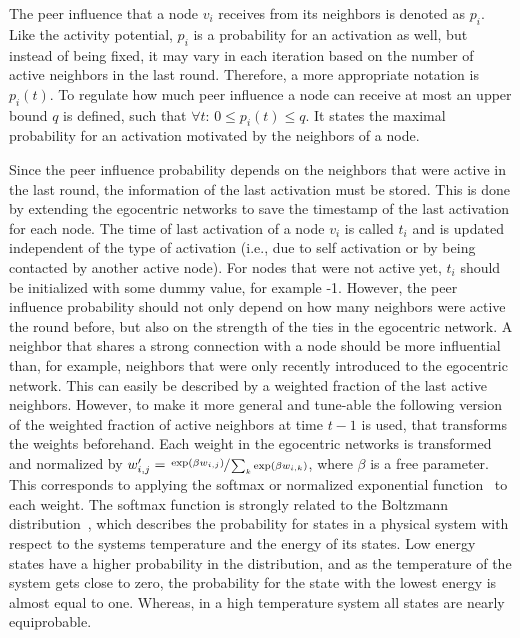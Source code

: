 The peer influence that a node \(v_{i} \) receives from its neighbors is denoted as \( p_{i} \).
Like the activity potential, \( p_{i} \) is a probability for an activation as well, but instead of being fixed, it may vary in each iteration based on the number of active neighbors in the last round.
Therefore, a more appropriate notation is \( p_{i}(t) \).
To regulate how much peer influence a node can receive at most an upper bound \( q \) is defined, such that \(\forall t: \, 0 \leq p_{i}(t) \leq q\).
It states the maximal probability for an activation motivated by the neighbors of a node.

Since the peer influence probability depends on the neighbors that were active in the last round, the information of the last activation must be stored.
This is done by extending the egocentric networks to save the timestamp of the last activation for each node.
The time of last activation of a node \( v_{i} \) is called \( t_{i} \) and is updated independent of the type of activation (i.e., due to self activation or by being contacted by another active node).
For nodes that were not active yet, \( t_{i} \) should be initialized with some dummy value, for example -1.
However, the peer influence probability should not only depend on how many neighbors were active the round before, but also on the strength of the ties in the egocentric network.
A neighbor that shares a strong connection with a node should be more influential than, for example, neighbors that were only recently introduced to the egocentric network.
This can easily be described by a weighted fraction of the last active neighbors.
However, to make it more general and tune-able the following version of the weighted fraction of active neighbors at time \(t - 1\) is used, that transforms the weights beforehand.
Each weight in the egocentric networks is transformed and normalized by \( w'_{i,j} = \sfrac{\exp(\beta w_{i,j})}{\sum_{k} \exp(\beta w_{i,k})} \), where \( \beta \) is a free parameter.
This corresponds to applying the softmax or normalized exponential function~\cite{Bishop2006} to each weight.
The softmax function is strongly related to the Boltzmann distribution~\cite{vanLaarhoven1987}, which describes the probability for states in a physical system with respect to the systems temperature and the energy of its states.
Low energy states have a higher probability in the distribution, and as the temperature of the system gets close to zero, the probability for the state with the lowest energy is almost equal to one.
Whereas, in a high temperature system all states are nearly equiprobable.
